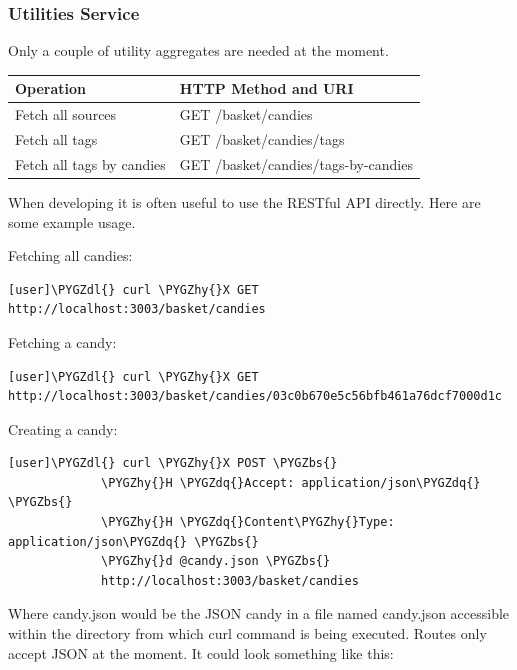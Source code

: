 \documentclass[letterpaper,10pt,english]{sphinxmanual}
\def\PYGZbs{\char`\\}
\def\PYGZdl{\char`\$}
\def\PYGZhy{\char`\-}
\def\PYGZdq{\char`\"}
\begin{document}
\subsubsection{Utilities Service}
\label{developer-guide:utilities-service}
Only a couple of utility aggregates are needed at the moment.

\begin{tabulary}{\linewidth}{|L|L|}
\hline
\textsf{\relax 
Operation
} & \textsf{\relax 
HTTP Method and URI
}\\
\hline
Fetch all sources
 & 
GET /basket/candies
\\

Fetch all tags
 & 
GET /basket/candies/tags
\\

Fetch all tags by candies
 & 
GET /basket/candies/tags-by-candies
\\
\hline\end{tabulary}


When developing it is often useful to use the RESTful API
directly. Here are some example usage.

Fetching all candies:

\begin{Verbatim}[commandchars=\\\{\}]
[user]\PYGZdl{} curl \PYGZhy{}X GET http://localhost:3003/basket/candies
\end{Verbatim}

Fetching a candy:

\begin{Verbatim}[commandchars=\\\{\}]
[user]\PYGZdl{} curl \PYGZhy{}X GET http://localhost:3003/basket/candies/03c0b670e5c56bfb461a76dcf7000d1c
\end{Verbatim}

Creating a candy:

\begin{Verbatim}[commandchars=\\\{\}]
[user]\PYGZdl{} curl \PYGZhy{}X POST \PYGZbs{}
             \PYGZhy{}H \PYGZdq{}Accept: application/json\PYGZdq{}  \PYGZbs{}
             \PYGZhy{}H \PYGZdq{}Content\PYGZhy{}Type: application/json\PYGZdq{} \PYGZbs{}
             \PYGZhy{}d @candy.json \PYGZbs{}
             http://localhost:3003/basket/candies
\end{Verbatim}

Where candy.json would be the JSON candy in a file named candy.json
accessible within the directory from which curl command is being
executed. Routes only accept JSON at the moment.  It could look
something like this:
\end{document}
